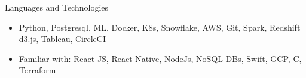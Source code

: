 \documentclass[]{ahmedamrcv}
\begin{document}
	\begin{cvsection}{Languages and Technologies}
		\begin{cvsubsection}{}{}{}	
			\begin{itemize}
				\item Python, Postgresql, ML, Docker, K8s, Snowflake, AWS, Git, Spark, Redshift d3.js, Tableau, CircleCI
				\item Familiar with: React JS, React Native, NodeJs, NoSQL DBs, Swift, GCP, C, Terraform
			\end{itemize}
		\end{cvsubsection}
	\end{cvsection}
\end{document}
